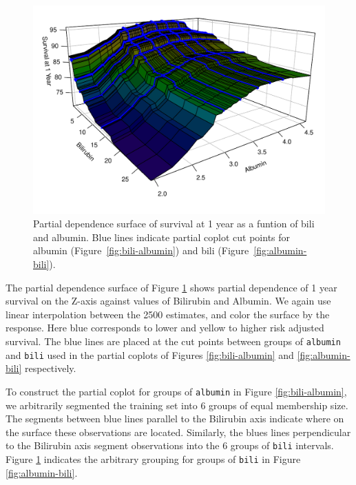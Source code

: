 \documentclass[article]{jss}
\begin{document}
\begin{Schunk}
\begin{figure}[!htb]

{\centering \includegraphics{fig-rfs/rfs-surface3d-1} 

}

\caption{Partial dependence surface of survival at 1 year as a funtion of bili and albumin. Blue lines indicate partial coplot cut points for albumin (Figure~\ref{fig:bili-albumin}) and bili (Figure~\ref{fig:albumin-bili}).}\label{fig:surface3d}
\end{figure}
\end{Schunk}

The partial dependence surface of Figure \ref{fig:surface3d} shows
partial dependence of 1 year survival on the Z-axis against values of
Bilirubin and Albumin. We again use linear interpolation between the
2500 estimates, and color the surface by the response. Here blue
corresponds to lower and yellow to higher risk adjusted survival. The
blue lines are placed at the cut points between groups of
\texttt{albumin} and \texttt{bili} used in the partial coplots of
Figures \ref{fig:bili-albumin} and \ref{fig:albumin-bili} respectively.

To construct the partial coplot for groups of \texttt{albumin} in Figure
\ref{fig:bili-albumin}, we arbitrarily segmented the training set into 6
groups of equal membership size. The segments between blue lines
parallel to the Bilirubin axis indicate where on the surface these
observations are located. Similarly, the blues lines perpendicular to
the Bilirubin axis segment observations into the 6 groups of
\texttt{bili} intervals. Figure \ref{fig:surface3d} indicates the
arbitrary grouping for groups of \texttt{bili} in Figure
\ref{fig:albumin-bili}.
\end{document}
